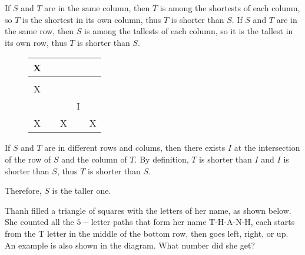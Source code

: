 \documentclass{article}
\begin{document}
\begin{soln}
    If $S$ and $T$ are in the same column, then $T$ is among the shortests of each column,
    so $T$ is the shortest in its own column, thus $T$ is shorter than $S$.
    If $S$ and $T$ are in the same row, then $S$ is among the tallests of each column,
    so it is the tallest in its own row, thus $T$ is shorter than $S$.

    \begin{figure}[h]
        \centering
        \begin{tabular}{|c|c|c|c|c|}
            \hline
            {\color[HTML]{FFFFFF} X} &                                                  &                          &                                                  &                          \\ \hline
                                    &                                                  &                          & \cellcolor[HTML]{FFFFFF}{\color[HTML]{3531FF} T} &                          \\ \hline
            {\color[HTML]{FFFFFF} X} &                                                  &                          &                                                  &                          \\ \hline
                                    & \cellcolor[HTML]{FFFFFF}{\color[HTML]{FE0000} S} &                          & \cellcolor[HTML]{EFEFEF}I                        &                          \\ \hline
            {\color[HTML]{FFFFFF} X} &                                                  & {\color[HTML]{FFFFFF} X} &                                                  & {\color[HTML]{FFFFFF} X} \\ \hline
        \end{tabular}
    \end{figure}

    If $S$ and $T$ are in different rows and colums,
    then there exists $I$ at the intersection of the row of $S$ and the column of $T$.
    By definition, $T$ is shorter than $I$ and $I$ is shorter than $S$,
    thus $T$ is shorter than $S$.

    Therefore, $\boxed{S}$ is the taller one.
\end{soln}

\newpage

\begin{example*}

    Thanh filled a triangle of squares with the letters of her name, as shown below.
    She counted all the $5-$letter paths that form her name T-H-A-N-H,
    each starts from the T letter in the middle of the bottom row,
    then goes left, right, or up. An example is also shown in the diagram.
    What number did she get?
\end{example*}
\end{document}
